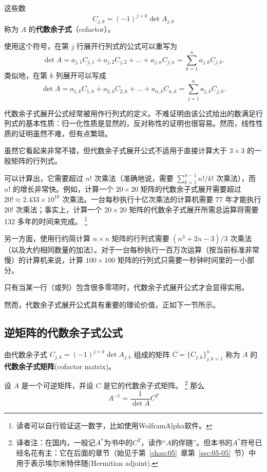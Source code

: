 \begin{definition*}
这些数
$$C_{j,k} = (-1)^{j+k} \det A_{j,k}$$
称为 $A$ 的\textbf{代数余子式}（cofactor）。
\end{definition*}

使用这个符号，在第 $j$ 行展开行列式的公式可以重写为
$$\det A = a_{j,1} C_{j,1} + a_{j,2} C_{j,2} + \dots + a_{j,n} C_{j,n} = \sum_{k=1}^n a_{j,k} C_{j,k}.$$
类似地，在第 $k$ 列展开可以写成
$$\det A = a_{1,k} C_{1,k} + a_{2,k} C_{2,k} + \dots + a_{n,k} C_{n,k} = \sum_{j=1}^n a_{j,k} C_{j,k}.$$

\begin{remark*}
代数余子式展开公式经常被用作行列式的定义。不难证明由该公式给出的数满足行列式的基本性质：归一化性质是显然的，反对称性的证明也很容易。然而，线性性质的证明虽然不难，但有点繁琐。
\end{remark*}

\begin{remark*}
虽然它看起来非常不错，但代数余子式展开公式不适用于直接计算大于 $3 \times 3$ 的一般矩阵的行列式。
\end{remark*}

可以计算出，它需要超过 $n!$ 次乘法（准确地说，需要 $\sum_{k=1}^{n-1} n!/k!$ 次乘法），而 $n!$ 的增长非常快。例如，计算一个 $20 \times 20$ 矩阵的代数余子式展开需要超过 $20! \approx 2.433 \times 10^{18}$ 次乘法。一台每秒执行十亿次乘法的计算机需要 77 年才能执行 $20!$ 次乘法；事实上，计算一个 $20 \times 20$ 矩阵的代数余子式展开所需总运算将需要 132 多年的时间来完成。
\footnote{
读者可以自行验证这一数字，比如使用WolframAlpha软件。
}

另一方面，使用行约简计算 $n \times n$ 矩阵的行列式需要 $(n^3 + 2n - 3) / 3$ 次乘法（以及大约相同数量的加法）。对于一台每秒执行一百万次运算（按当前标准非常慢）的计算机来说，计算 $100 \times 100$ 矩阵的行列式只需要一秒钟时间里的一小部分。

只有当某一行（或列）包含很多零项时，代数余子式展开公式才会显得实用。

然而，代数余子式展开公式具有重要的理论价值，正如下一节所示。

\subsection{逆矩阵的代数余子式公式}\label{sec:03-05-01}

由代数余子式 $C_{j,k} = (-1)^{j+k} \det A_{j,k}$ 组成的矩阵 $C = \{C_{j,k}\}^{n}_{j,k=1}$ 称为 $A$ 的\textbf{代数余子式矩阵}(cofactor matrix)。

\begin{theorem}\label{stmt:03-05-02}  设 $A$ 是一个可逆矩阵，并设 $C$ 是它的代数余子式矩阵。
\footnote{
译者注：在国内，一般记$A^*$为书中的$C^T$，读作“$A$的伴随”。但本书的$A^*$符号已经名花有主：它在后面的章节（始见于第~\ref{chap:05}~章第~\ref{sec:05-05}~节）中用于表示埃尔米特伴随(Hermitian adjoint).
}
那么
$$
A^{-1} = \frac{1}{\det A} C^T
$$\end{theorem}

